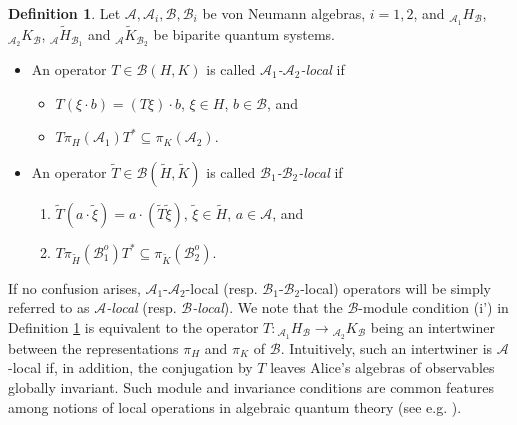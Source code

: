 \documentclass[11pt]{amsart}
\theoremstyle{definition}
\newtheorem{defn}[theorem]{Definition}
\newcommand{\cl}[1]{\mathcal{#1}}
\begin{document}
\begin{defn}\label{d:Alocal} 
Let $\cl{A}, \cl{A}_i, \cl{B}, \cl{B}_i$ be von Neumann algebras, $i = 1,2$, 
and $_{\cl{A}_1}H_{\cl{B}}$, $_{\cl{A}_2}K_{\cl{B}}$, $_{\cl{A}}\tilde{H}_{\cl{B}_1}$ and 
$_{\cl{A}}\tilde{K}_{\cl{B}_2}$ be biparite quantum systems.

\begin{itemize}
\item[(i)] 
An operator $T\in\cl B(H,K)$ is called \textit{$\cl{A}_1$-$\cl{A}_2$-local} if
\begin{itemize}
\item[(i')] $T(\xi\cdot b)=(T\xi)\cdot b$, $\xi\in H$, $b\in \cl{B}$, and 
\item[(i'')] $T\pi_{H}(\cl{A}_1)T^*\subseteq\pi_{K}(\cl{A}_2)$.
\end{itemize} 

\item[(ii)] 
An operator $\tilde{T}\in\cl B(\tilde{H},\tilde{K})$ is called \textit{$\cl{B}_1$-$\cl{B}_2$-local} if
\begin{enumerate}
\item[(ii')] $\tilde{T}(a\cdot \tilde{\xi}) = a\cdot (\tilde{T}\tilde{\xi})$, 
$\tilde{\xi}\in \tilde{H}$, $a\in \cl{A}$, and 
\item[(ii'')] $T\pi_{\tilde{H}}(\cl{B}_1^o)T^*\subseteq\pi_{\tilde{K}}(\cl{B}_2^o)$.
\end{enumerate} 
\end{itemize}
\end{defn}


If no confusion arises, $\cl{A}_1$-$\cl{A}_2$-local 
(resp. $\cl{B}_1$-$\cl{B}_2$-local) operators will be simply referred to 
as \emph{$\cl{A}$-local} (resp. \emph{$\cl{B}$-local}). 
We note that the $\cl{B}$-module condition (i') in Definition \ref{d:Alocal} 
is equivalent to the operator
$T : \mbox{}_{\cl{A}_1}H_{\cl{B}} \to \textbf{}_{\cl{A}_2}K_{\cl{B}}$ 
being an intertwiner between the representations $\pi_H$ and $\pi_K$ of $\cl{B}$.
Intuitively, such an intertwiner 
is $\cl{A}$-local if, in addition, the conjugation by $T$ leaves 
Alice's algebras of observables globally invariant. Such module and invariance conditions are common features among notions of local operations in algebraic quantum theory (see e.g. \cite{cckl, cklt, kita,lsww,vw}).
\end{document}
